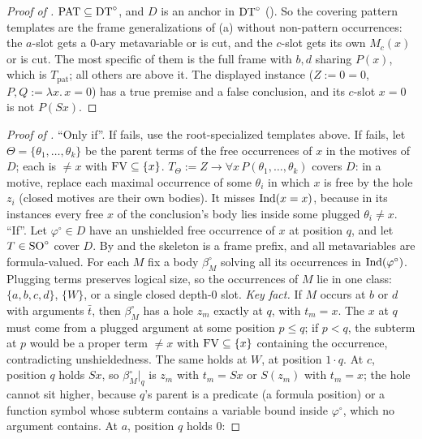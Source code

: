 \begin{proof}[Proof of ]
$\mathrm{PAT}\subseteq\mathrm{DT}^{\circ}$, and $D$ is an anchor in $\mathrm{DT}^{\circ}$ (). So the covering pattern templates are the
frame generalizations of (a) without non-pattern occurrences: the $a$-slot gets a 0-ary
metavariable or is cut, and the $c$-slot gets its own $M_c(x)$ or is cut. The most specific of them is the full frame
with $b,d$ sharing $P(x)$, which is $T_{\mathrm{pat}}$; all others are above it. The displayed instance ($Z:=0=0$,
$P,Q:=\lambda x.\,x=0$) has a true premise and a false conclusion, and its $c$-slot $x=0$ is not $P(Sx)$.
\end{proof}

\begin{proof}[Proof of ]
``Only if''. If \evR{} fails, use the root-specialized templates above. If \zfB{} fails, let $\Theta=\{\theta_1,\dots,
\theta_k\}$ be the parent terms of the free occurrences of $x$ in the motives of $D$; each is $\ne x$ with
$\mathrm{FV}\subseteq\{x\}$. $T_\Theta:=Z\to\forall x\,P(\theta_1,\dots,\theta_k)$ covers $D$: in a motive, replace each maximal
occurrence of some $\theta_i$ in which $x$ is free by the hole $z_i$ (closed motives are their own bodies). It misses
$\mathrm{Ind}(x=x)$, because in its instances every free $x$ of the conclusion's body lies inside some plugged $\theta_i\ne x$.
``If''. Let $\varphi^\circ\in D$ have an unshielded free occurrence of $x$ at position $q$, and let $T\in\mathrm{SO}^{\circ}$ cover $D$. By
\evR{} and  the skeleton is a frame prefix, and all metavariables are formula-valued. For each $M$ fix a
body $\beta^\circ_M$ solving all its occurrences in $\mathrm{Ind}(\varphi^\circ)$. Plugging terms preserves logical size, so the
occurrences of $M$ lie in one class: $\{a,b,c,d\}$, $\{W\}$, or a single closed depth-0 slot.
\emph{Key fact.} If $M$ occurs at $b$ or $d$ with arguments $\bar t$, then $\beta^\circ_M$ has a hole $z_m$ exactly at $q$,
with $t_m=x$. The $x$ at $q$ must come from a plugged argument at some position $p\le q$; if $p<q$, the subterm at $p$ would
be a proper term $\ne x$ with $\mathrm{FV}\subseteq\{x\}$ containing the occurrence, contradicting unshieldedness. The same holds
at $W$, at position $1\cdot q$. At $c$, position $q$ holds $Sx$, so $\beta^\circ_M|_q$ is $z_m$ with $t_m=Sx$ or $S(z_m)$
with $t_m=x$; the hole cannot sit higher, because $q$'s parent is a predicate (a formula position) or a function symbol
whose subterm contains a variable bound inside $\varphi^\circ$, which no argument contains. At $a$, position $q$ holds $0$:

\end{proof}
